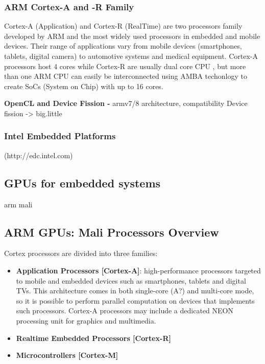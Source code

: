 \subsubsection {ARM Cortex-A and -R Family}
Cortex-A (Application) and Cortex-R (RealTime) are two processors family developed by ARM and the most widely used processors in embedded and mobile devices. Their range of applications vary from mobile devices (smartphones, tablets, digital camera) to automotive systems and medical equipment. Cortex-A processors host 4 cores while Cortex-R are usually dual core CPU , but more than one ARM CPU can easily be interconnected using AMBA techonlogy to create SoCs (System on Chip) with up to 16 cores.

\textbf{OpenCL and Device Fission - }
armv7/8 architecture, compatibility
Device fission -> big.little

\subsubsection {Intel Embedded Platforms}
(http://edc.intel.com)

\subsection{GPUs for embedded systems}
arm mali


\subsection{ARM GPUs: Mali Processors Overview}

Cortex processors are divided into three families:


\begin{itemize}
	\item  \textbf{Application Processors [Cortex-A]}: high-performance processors targeted to mobile and embedded devices such as smartphones, tablets and digital TVs. This architecture comes in both single-core (A?) and multi-core mode, so it is possible to perform parallel computation on devices that implements such processors. Cortex-A processors may include a dedicated NEON processing unit for graphics and multimedia.
	\item  \textbf{Realtime Embedded Processors [Cortex-R]}
	\item  \textbf{Microcontrollers [Cortex-M]}
\end{itemize}



